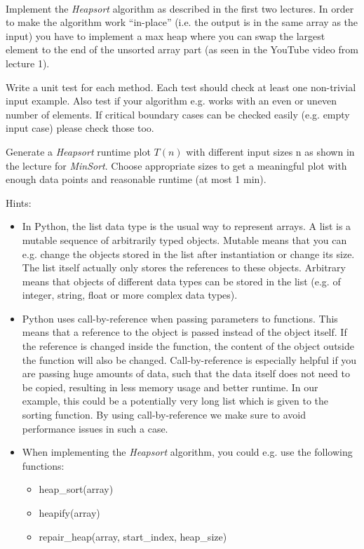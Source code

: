  \\
Implement the \textit{Heapsort} algorithm as described in the first two
lectures.
In order to make the algorithm work \enquote{in-place}
(i.e. the output is in the same array as the input)
you have to implement a max heap where you can
swap the largest element to the end of the unsorted array part
(as seen in the YouTube video from lecture 1).

Write a unit test for each method.  Each test should check at least one
non-trivial input example.  Also test if your algorithm e.g. works with an even or uneven number of elements. If critical boundary cases
can be checked easily (e.g. empty input case) please check those too.

Generate a \textit{Heapsort} runtime plot $T(n)$ with different input sizes n as shown in the lecture for \textit{MinSort}.
Choose appropriate sizes to get a meaningful plot with enough data points and reasonable runtime (at most 1 min).%


\newpage
Hints:
\begin{itemize}
\item In Python, the list data type is the usual way to represent arrays. A list is a mutable sequence of arbitrarily typed objects. Mutable means that you can e.g. change the objects stored in the list after instantiation or change its size. The list itself actually only stores the references to these objects. Arbitrary means that objects of different data types can be stored in the list (e.g. of integer, string, float or more complex data types).
\item Python uses call-by-reference when passing parameters to functions. This means that a reference to the object is passed instead of the object itself. If the reference is changed inside the function, the content of the object outside the function will also be changed. Call-by-reference is especially helpful if you are passing huge amounts of data, such that the data itself does not need to be copied, resulting in less memory usage and better runtime. In our example, this could be a potentially very long list which is given to the sorting function. By using call-by-reference we make sure to avoid performance issues in such a case.
\item When implementing the \emph{Heapsort} algorithm, you could e.g. use the following functions:
  \begin{itemize}
  \item heap\_sort(array)
  \item heapify(array)
  \item repair\_heap(array, start\_index, heap\_size)
  \end{itemize}
\end{itemize}

\vspace{1cm}




